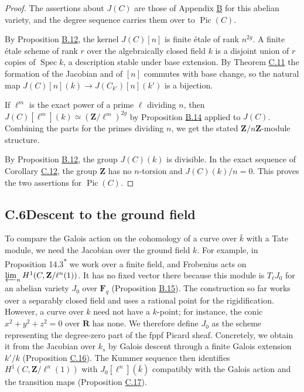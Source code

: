 \documentclass[11pt]{article}
\newcommand{\bpout}[1]{#1\textsuperscript{\hyperlink{bp-outside}{\ensuremath{\ast}}}}
\begin{document}
\begin{proof}[{Proof}]\label{bp164}%
The assertions about \(J(C)\) are those of Appendix \hyperref[bp75]{B} for this abelian variety, and the degree sequence carries them over to \(\operatorname{Pic}(C)\).

By Proposition \hyperref[bp108]{B.12}, the kernel \(J(C)[n]\) is finite étale of rank \(n^{2g}\). A finite étale scheme of rank \(r\) over the algebraically closed field \(k\) is a disjoint union of \(r\) copies of \(\operatorname{Spec}k\), a description stable under base extension. By Theorem \hyperref[bp154]{C.11} the formation of the Jacobian and of \([n]\) commutes with base change, so the natural map \(J(C)[n](k)\to J(C_{k'})[n](k')\) is a bijection.

If \(\ell^m\) is the exact power of a prime \(\ell\) dividing \(n\), then \(J(C)[\ell^m](k)\simeq(\mathbf Z/\ell^m)^{2g}\) by Proposition \hyperref[bp114]{B.14} applied to \(J(C)\). Combining the parts for the primes dividing \(n\), we get the stated \(\mathbf Z/n\mathbf Z\)-module structure.

By Proposition \hyperref[bp108]{B.12}, the group \(J(C)(k)\) is divisible. In the exact sequence of Corollary \hyperref[bp157]{C.12}, the group \(\mathbf Z\) has no \(n\)-torsion and \(J(C)(k)/n=0\). This proves the two assertions for \(\operatorname{Pic}(C)\).
\end{proof}


\subsection*{\texorpdfstring{C.6\quad Descent to the ground field}{C.6 Descent to the ground field}}
\label{bp165}%
\label{bp166}%
To compare the Galois action on the cohomology of a curve over \(\bar k\) with a Tate module, we need the Jacobian over the ground field \(k\). For example, in Proposition \bpout{14.3} we work over a finite field, and Frobenius acts on \(\varprojlim_nH^1(C,\mathbf Z/\ell^n(1))\). It has no fixed vector there because this module is \(T_\ell J_0\) for an abelian variety \(J_0\) over \(\mathbf F_q\) (Proposition \hyperref[bp117]{B.15}). The construction so far works over a separably closed field and uses a rational point for the rigidification. However, a curve over \(k\) need not have a \(k\)-point; for instance, the conic \(x^2+y^2+z^2=0\) over \(\mathbf R\) has none. We therefore define \(J_0\) as the scheme representing the degree-zero part of the fppf Picard sheaf. Concretely, we obtain it from the Jacobian over \(k_s\) by Galois descent through a finite Galois extension \(k'/k\) (Proposition \hyperref[bp167]{C.16}). The Kummer sequence then identifies \(H^1(C,\mathbf Z/\ell^n(1))\) with \(J_0[\ell^n](\bar k)\) compatibly with the Galois action and the transition maps (Proposition \hyperref[bp170]{C.17}).
\end{document}
